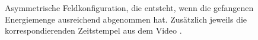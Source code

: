 \begin{figure}
    \begin{center}
        \hfill
        \caption{%
            Asymmetrische Feldkonfiguration, die entsteht, wenn die gefangenen Energiemenge ausreichend abgenommen hat. 
            Zusätzlich jeweils die korrespondierenden Zeitstempel aus dem Video \cite{particles:video-particle}.}\label{particles:fig:partikel:abnehmen:asymmetrisch}
    \end{center}
\end{figure}
